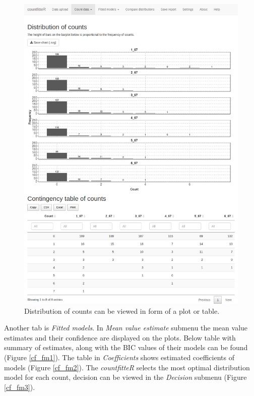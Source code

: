 \begin{figure}[htbp]
  \centering
  \includegraphics[width=0.99\columnwidth]{fig/cf_cd3.png}
  \caption{Distribution of counts can be viewed in form of a plot or table.}
    \label{cf_cd3}
\end{figure}

Another tab is \textit{Fitted models}. In \textit{Mean value estimate} submenu the mean value estimates and their confidence are displayed on the plots. Below table with summary of estimates, along with the BIC values of their models can be found (Figure \ref{cf_fm1}). The table in \textit{Coefficients} shows estimated coefficients of models (Figure \ref{cf_fm2}). The \emph{countfitteR} selects the most optimal distribution model for each count, decision can be viewed in the \textit{Decision} submenu (Figure \ref{cf_fm3}).

